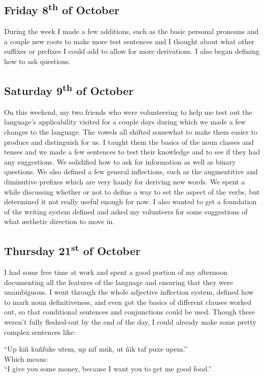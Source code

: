 \documentclass[a4paper,10pt]{article}
\begin{document}
\subsection{Friday 8\textsuperscript{th} of October}
During the week I made a few additions, such as the basic personal pronouns and a couple new
roots to make more test sentences and I thought about what other suffixes or prefixes I
could add to allow for more derivations. I also began defining how to ask questions.

\subsection{Saturday 9\textsuperscript{th} of October}
On this weekend, my two friends who were volunteering to help me test out the language's
applicability visited for a couple days during which we made a few changes to the language.
The vowels all shifted somewhat to make them easier to produce and distinguish for us. I
taught them the basics of the noun classes and tenses and we made a few sentences to test
their knowledge and to see if they had any suggestions. We solidified how to ask for
information as well as binary questions. We also defined a few general inflections, such
as the augmentitive and diminutive prefixes which are very handy for deriving new words.
We spent a while discussing whether or not to define a way to set the aspect of the verbs,
but determined it not really useful enough for now. I also wanted to get a foundation of
the writing system defined and asked my volunteers for some suggestions of what \ae sthetic
direction to move in.

\subsection{Thursday 21\textsuperscript{st} of October}
I had some free time at work and spent a good portion of my afternoon documenting all the
features of the language and ensuring that they were unambiguous. I went through the whole
adjective inflection system, defined how to mark noun definitiveness, and even got the
basics of different clauses worked out, so that conditional sentences and conjunctions
could be used. Though these weren't fully fleshed-out by the end of the day, I could
already make some pretty complex sentences like: 

\begin{center}
    ``Up kiñ kuñfuke utem, up nif muk, ut ñik taf puxe upem.'' \\
    Which means:\\
    ``I give you some money, because I want you to get me good food.''
\end{center}
\end{document}
